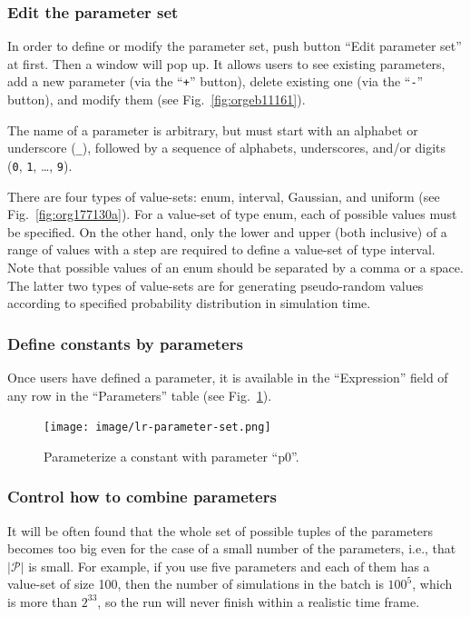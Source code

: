 \documentclass[a4paper,10pt]{report}
\begin{document}
\subsubsection{Edit the parameter set}
\label{sec:org0ac3bc6}
In order to define or modify the parameter set, push button ``Edit parameter
set'' at first. Then a window will pop up. It allows users to see existing
parameters, add a new parameter (via the ``\texttt{+}'' button), delete existing
one (via the ``\texttt{-}'' button), and modify them (see
Fig.~\ref{fig:orgeb11161}).

The name of a parameter is arbitrary, but must start with an alphabet or
underscore (\texttt{\_}), followed by a sequence of alphabets, underscores, and/or
digits (\texttt{0}, \texttt{1}, \ldots{}, \texttt{9}).

There are four types of value-sets: enum, interval, Gaussian, and uniform
(see Fig.~\ref{fig:org177130a}).
For a value-set of type enum, each of possible values must be specified.
On the other hand, only the lower and upper (both inclusive) of a range
of values with a step are required to define a value-set of type interval.
Note that possible values of an enum should be separated by a comma or a space.
The latter two types of value-sets are for generating pseudo-random values
according to specified probability distribution in simulation time.

\subsubsection{Define constants by parameters}
\label{sec:orge6a530e}
Once users have defined a parameter, it is available in the ``Expression'' field
of any row in the ``Parameters'' table (see Fig.~\ref{fig:org4014dd1}).

\begin{figure}[htbp]
\centering
\texttt{[image: image/lr-parameter-set.png]}
\caption{\label{fig:org4014dd1}Parameterize a constant with parameter ``p0''.}
\end{figure}

\subsubsection{\label{orgb96934f}Control how to combine parameters}
\label{sec:orge68e601}
It will be often found that the whole set of possible tuples of the parameters
becomes too big even for the case of a small number of the parameters, i.e., that
\(\lvert \mathcal{P} \rvert\) is small. For example, if you use five parameters
and each of them has a value-set of size 100, then the number of simulations
in the batch is \(100^5\), which is more than \(2^{33}\), so the run will never finish
within a realistic time frame.
\end{document}

